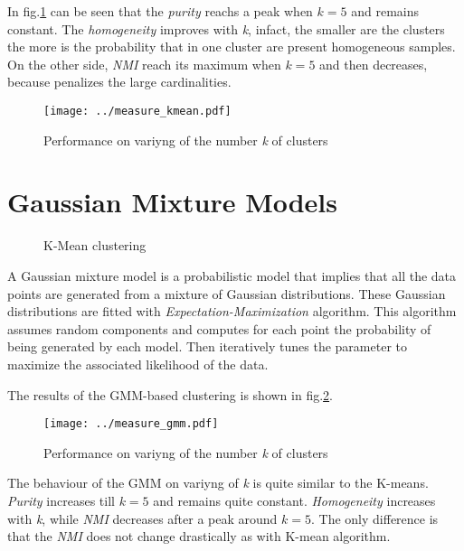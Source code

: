 \documentclass[10pt,a4paper]{article}
\begin{document}
In fig.\ref{fig:measure_kmean} can be seen that the \emph{purity} reachs a peak when $k=5$ and remains constant. The \emph{homogeneity} improves with \emph{k}, infact, the smaller are the clusters the more is the probability that in one cluster are present homogeneous samples. On the other side, \emph{NMI} reach its maximum when $k=5$ and then decreases, because penalizes the large cardinalities.

\begin{figure}
\centering
\texttt{[image: ../measure\_kmean.pdf]}
\caption{Performance on variyng of the number \emph{k} of clusters}
\label{fig:measure_kmean}
\end{figure}

\clearpage
\section{Gaussian Mixture Models}

\begin{figure}[!h]
	\centering
	\qquad\qquad
	\qquad\qquad
	\qquad\qquad
	\qquad\qquad
	\caption{K-Mean clustering\label{Gmm}}
\end{figure} 

A Gaussian mixture model is a probabilistic model that implies that all the data points are generated from a mixture of Gaussian distributions. These Gaussian distributions are fitted with \emph{Expectation-Maximization} algorithm. This algorithm assumes random components and computes for each point the probability of being generated by each model. Then iteratively tunes the parameter to maximize the associated likelihood of the data.

The results of the GMM-based clustering is shown in fig.\ref{Gmm}.

\begin{figure}[h]
	\centering
	\texttt{[image: ../measure\_gmm.pdf]}
	\caption{Performance on variyng of the number \emph{k} of clusters}
	\label{fig:measure_gmm}
\end{figure}

The behaviour of the GMM on variyng of \emph{k} is quite similar to the K-means. \emph{Purity} increases till $k=5$ and remains quite constant. \emph{Homogeneity} increases with \emph{k}, while \emph{NMI} decreases after a peak around $k=5$. The only difference is that the \emph{NMI} does not change drastically as with K-mean algorithm.
\end{document}
